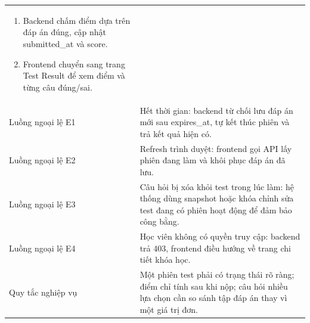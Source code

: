 \documentclass[12pt,a4paper]{report}
\begin{document}
\begin{longtable}{L{4cm} L{10.5cm}}
\begin{enumerate}[leftmargin=*]
\item Backend chấm điểm dựa trên đáp án đúng, cập nhật submitted\_at và score.
\item Frontend chuyển sang trang Test Result để xem điểm và từng câu đúng/sai.
\end{enumerate} \\
Luồng ngoại lệ E1 & Hết thời gian: backend từ chối lưu đáp án mới sau expires\_at, tự kết thúc phiên và trả kết quả hiện có. \\
Luồng ngoại lệ E2 & Refresh trình duyệt: frontend gọi API lấy phiên đang làm và khôi phục đáp án đã lưu. \\
Luồng ngoại lệ E3 & Câu hỏi bị xóa khỏi test trong lúc làm: hệ thống dùng snapshot hoặc khóa chỉnh sửa test đang có phiên hoạt động để đảm bảo công bằng. \\
Luồng ngoại lệ E4 & Học viên không có quyền truy cập: backend trả 403, frontend điều hướng về trang chi tiết khóa học. \\
Quy tắc nghiệp vụ & Một phiên test phải có trạng thái rõ ràng; điểm chỉ tính sau khi nộp; câu hỏi nhiều lựa chọn cần so sánh tập đáp án thay vì một giá trị đơn. \\
\bottomrule
\end{longtable}
\end{document}

